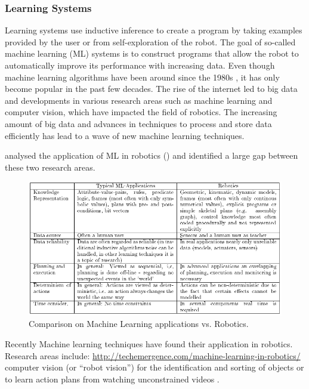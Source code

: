 \subsubsection{Learning Systems}\label{sssec:Learning Systems}
Learning systems use inductive inference to create a program by taking examples provided by the user or from self-exploration of the robot. The goal of so-called machine learning (ML) systems is to construct programs that allow the robot to automatically improve its performance with increasing data. Even though machine learning algorithms have been around since the 1980s \cite{}, it has only become popular in the past few decades. The rise of the internet led to big data and developments in various research areas such as machine learning and computer vision, which have impacted the field of robotics.
The increasing amount of big data and advances in techniques to process and store data efficiently has lead to a wave of new machine learning techniques. 

\cite{Kreuziger1992} analysed the application of ML in robotics () and identified a large gap between these two research areas.


 \begin{figure}[ht]
  \centering
\includegraphics[width=\linewidth]{figures/Kreuziger1992-Comparison ML Robotics}
  \caption{Comparison on Machine Learning applications vs. Robotics. \cite{Kreuziger1992}}
  \label{fig:MLvsRobotics}
\end{figure} 

\cite{kaiser1995obtaining} 

Recently Machine learning techniques have found their application in robotics. Research areas include: \url{http://techemergence.com/machine-learning-in-robotics/}\\
computer vision (or ``robot vision'') for the identification and sorting of objects \cite{stager2013computer} or to learn action plans from watching unconstrained videos \cite{Yang2015}.


